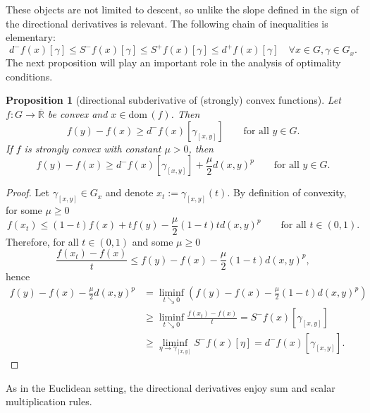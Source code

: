 \documentclass{article}
\theoremstyle{plain}\newtheorem{theorem}{Theorem}[section]
\theoremstyle{plain}\newtheorem{definition}[theorem]{Definition}
\theoremstyle{plain}\newtheorem{lemma}[theorem]{Lemma}
\theoremstyle{definition}\newtheorem{remark}[theorem]{Remark}
\theoremstyle{definition}\newtheorem{example}[theorem]{Example}
\theoremstyle{plain}\newtheorem{proposition}[theorem]{Proposition}
\theoremstyle{plain}\newtheorem{inference}[theorem]{Inference}
\theoremstyle{plain}\newtheorem{corollary}[theorem]{Corollary}
\theoremstyle{plain}\newtheorem{assumption}[theorem]{Assumption}
\begin{document}
These objects are not limited to descent, so unlike the slope defined in \cite[Definition 2.1.4]{AmbGigSav2005} the sign of the directional derivatives is relevant. The following chain of inequalities is elementary:
\begin{equation}\label{eq: eleme ineqs}
    d^-f(x)[\gamma]\leq S^-f(x)[\gamma]\leq S^+f(x)[\gamma]\leq d^+f(x)[\gamma]\quad\forall x\in G, \gamma\in G_x.
\end{equation}
The next proposition will play an important role in the analysis of optimality conditions.
\begin{proposition}[directional subderivative of (strongly) convex functions]\label{pr: dir dervt of cvx fct}
    Let $f:G\to\overline{\mathbb{R}}$ be convex  and $x\in\mathrm{dom}\,(f)$.  Then
    $$
    f(y)-f(x)\geq d^-f(x)[\gamma_{[x,y]}] \qquad\text{for all}\,\,y\in G.
    $$
    If $f$ is strongly convex with constant $\mu>0$, then
    $$
    f(y)-f(x)\geq d^-f(x)[\gamma_{[x,y]}]+\frac{\mu}{2}d(x,y)^p \qquad\text{for all}\,\,y\in G.
    $$
\end{proposition}
\begin{proof}
    Let $\gamma_{[x,y]}\in G_x$ and denote $x_t:=\gamma_{[x,y]}(t)$. By definition of convexity, for some $\mu\geq 0$
    $$
    f(x_t)\leq (1-t)f(x)+tf(y)-\frac{\mu}{2}(1-t)td(x,y)^p \qquad\text{for all}\,\,t\in(0,1).
    $$
    Therefore, for all $t\in(0,1)$ and some $\mu\geq 0$
    $$
    \frac{f(x_t)-f(x)}{t}\leq f(y)-f(x)-\frac{\mu}{2}(1-t)d(x,y)^p,
    $$
    hence
    \begin{align*}
        f(y)-f(x)-\frac{\mu}{2}d(x,y)^p&=\liminf_{t\searrow 0}\left(f(y)-f(x)-\frac{\mu}{2}(1-t)d(x,y)^p\right)\\
        &\geq\liminf_{t\searrow 0}\frac{f(x_t)-f(x)}{t}=S^-f(x)[\gamma_{[x,y]}]\\
        &\geq\liminf_{\eta\to\gamma_{[x,y]}}S^-f(x)[\eta]=d^-f(x)[\gamma_{[x,y]}].
    \end{align*}
\end{proof}
As in the Euclidean setting, the directional derivatives enjoy sum and scalar multiplication rules.
\end{document}

